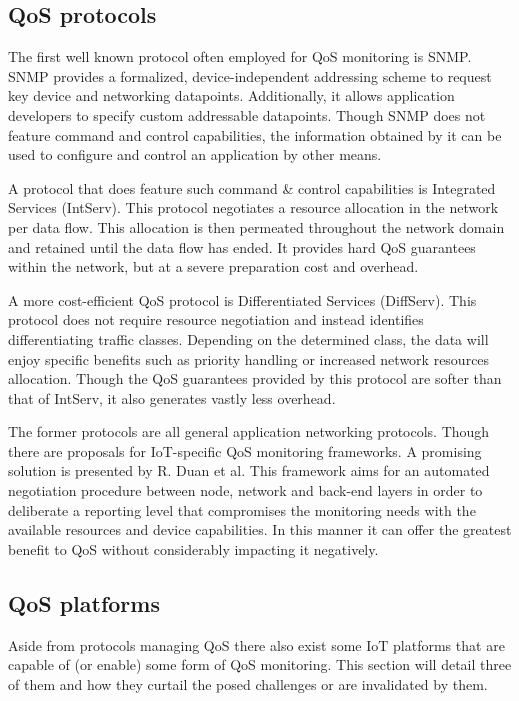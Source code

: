 \subsection{QoS protocols}
\label{sec:qos-protocols}
The first well known protocol often employed for QoS monitoring is SNMP\cite{snmp}. SNMP provides a formalized, device-independent addressing scheme to request key device and networking datapoints. Additionally, it allows application developers to specify custom addressable datapoints. Though SNMP does not feature command and control capabilities, the information obtained by it can be used to configure and control an application by other means.

A protocol that does feature such command \& control capabilities is Integrated Services (IntServ)\cite{intserv_diffserv_uitleg}. This protocol negotiates a resource allocation in the network per data flow. This allocation is then permeated throughout the network domain and retained until the data flow has ended. It provides hard QoS guarantees within the network, but at a severe preparation cost and overhead.

A more cost-efficient QoS protocol is Differentiated Services (DiffServ)\cite{intserv_diffserv_uitleg}. This protocol does not require resource negotiation and instead identifies differentiating traffic classes. Depending on the determined class, the data will enjoy specific benefits such as priority handling or increased network resources allocation. Though the QoS guarantees provided by this protocol are softer than that of IntServ, it also generates vastly less overhead.

The former protocols are all general application networking protocols. Though there are proposals for IoT-specific QoS monitoring frameworks. A promising solution is presented by R. Duan et al\cite{qos_extensive_architecture}. This framework aims for an automated negotiation procedure between node, network and back-end layers in order to deliberate a reporting level that compromises the monitoring needs with the available resources and device capabilities. In this manner it can offer the greatest benefit to QoS without considerably impacting it negatively.

\subsection{QoS platforms}
Aside from protocols managing QoS there also exist some IoT platforms that are capable of (or enable) some form of QoS monitoring. This section will detail three of them and how they curtail the posed challenges or are invalidated by them.
